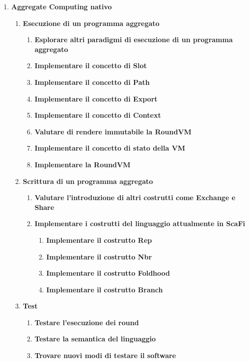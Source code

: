 \documentclass[12pt, a4paper]{article}
\begin{document}
\begin{enumerate}
    \color{teal}
    \item \textbf{Aggregate Computing nativo}
        \begin{enumerate}
            \item \textbf{Esecuzione di un programma aggregato}
            \begin{enumerate}
                \item \textbf{Esplorare altri paradigmi di esecuzione di un programma aggregato}
                \item \textbf{Implementare il concetto di Slot}
                \item \textbf{Implementare il concetto di Path}
                \item \textbf{Implementare il concetto di Export}
                \item \textbf{Implementare il concetto di Context}
                \item \textbf{Valutare di rendere immutabile la RoundVM}
                \item \textbf{Implementare il concetto di stato della VM}
                \item \textbf{Implementare la RoundVM}
            \end{enumerate}

            \item \textbf{Scrittura di un programma aggregato}
            \begin{enumerate}
                \item \textbf{Valutare l'introduzione di altri costrutti come Exchange e Share}
                \item \textbf{Implementare i costrutti del linguaggio attualmente in ScaFi}
                \begin{enumerate}
                    \item \textbf{Implementare il costrutto Rep}
                    \item \textbf{Implementare il costrutto Nbr}
                    \item \textbf{Implementare il costrutto Foldhood}
                    \item \textbf{Implementare il costrutto Branch}
                \end{enumerate}
            \end{enumerate}
            

            \item \textbf{Test}
            \begin{enumerate}
                \item \textbf{Testare l'esecuzione dei round}
                \item \textbf{Testare la semantica del linguaggio}
                \item \textbf{Trovare nuovi modi di testare il software}
            \end{enumerate}
        \end{enumerate}


\end{enumerate}
\end{document}
